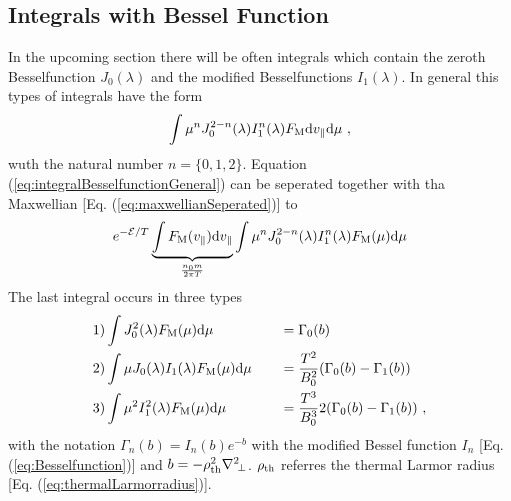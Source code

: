 \newpage

\subsection{Integrals with Bessel Function}
\label{sub:integralBesselfunction}

In the upcoming section there will be often integrals which contain the zeroth Besselfunction $J_0(\lambda)$ and the modified Besselfunctions $I_1(\lambda)$. In general this types of integrals have the form
\begin{gather}
	\int \mu^n J_0^{2-n}(\lambda) I_1^n(\lambda) F_\mathrm{M} \mathrm{d}v_\parallel\mathrm{d}\mu~,
	\label{eq:integralBesselfunctionGeneral}
\end{gather}
wuth the natural number $n = \{0, 1, 2\}$. Equation (\ref{eq:integralBesselfunctionGeneral}) can be seperated together with tha Maxwellian [Eq. (\ref{eq:maxwellianSeperated})] to
\begin{gather}
	e^{-\mathcal{E}/T} \underbrace{\int F_\mathrm{M}(v_\parallel) \mathrm{d}v_\parallel}_{\frac{n_0 m}{2\pi T}} \int \mu^n J_0^{2-n}(\lambda) I_1^n(\lambda) F_\mathrm{M}(\mu) \mathrm{d}\mu
	\label{eq:integralBesselfunctionGeneralSperated}
\end{gather}
The last integral occurs in three types
\begin{gather}
	\begin{aligned}
		1)& \int J_0^2(\lambda) F_\mathrm{M}(\mu) \mathrm{d}\mu &\quad &=  \Gamma_0(b) \\
		2)& \int \mu J_0(\lambda) I_1(\lambda) F_\mathrm{M}(\mu) \mathrm{d}\mu &\quad &= \frac{T^2}{B_0^2} (\Gamma_0(b) - \Gamma_1(b)) \\
		3)& \int \mu^2 I_1^2(\lambda) F_\mathrm{M}(\mu) \mathrm{d}\mu &\quad &= \frac{T^3}{B_0^3} 2 (\Gamma_0(b) - \Gamma_1(b))~, \\
	\end{aligned}
	\label{eq:integralBesselfunction}
\end{gather}
with the notation $\Gamma_n(b) = I_n(b) e^{-b}$ with the modified Bessel function $I_n$ [Eq. (\ref{eq:Besselfunction})] and $b= - \rho_{\mathrm{th}}^2 \nabla^2\!_\perp$. $\rho_{\mathrm{th}}$ referres the thermal Larmor radius [Eq. (\ref{eq:thermalLarmorradius})]. \source

